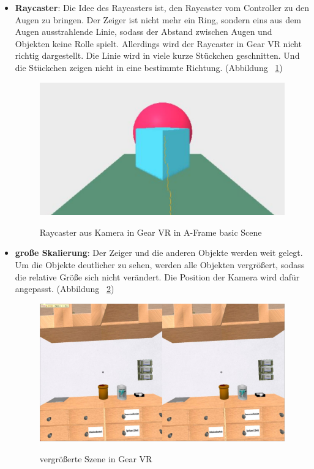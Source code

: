   \begin{itemize}
      \item \textbf{Raycaster}: Die Idee des Raycasters ist, den Raycaster vom Controller zu den Augen zu bringen. Der Zeiger ist nicht mehr ein Ring, sondern eins aus dem Augen ausstrahlende Linie, sodass der Abstand zwischen Augen und Objekten keine Rolle spielt. Allerdings wird der Raycaster in Gear VR nicht richtig dargestellt. Die Linie wird in viele kurze Stückchen geschnitten. Und die Stückchen zeigen nicht in eine bestimmte Richtung. (Abbildung ~\ref{fig:GearVRRaycaster})
      
\begin{figure}[ht]
\vspace*{2.5em}
\centering
\caption[Raycaster in Gear VR]{Raycaster aus Kamera in Gear VR in A-Frame basic Scene}
\includegraphics[width=\textwidth]{images/gearVRRaycaster.png}
\label{fig:GearVRRaycaster} 
\vspace*{1.5em}
\end{figure}
      
      \item \textbf{große Skalierung}: Der Zeiger und die anderen Objekte werden weit gelegt. Um die Objekte deutlicher zu sehen, werden alle Objekten vergrößert, sodass die relative Größe sich nicht verändert. Die Position der Kamera wird dafür angepasst.
      (Abbildung ~\ref{fig:GearVRCursor})
      
\begin{figure}[t]
\vspace*{1em}
\centering
\caption[vergrößerte Szene in Gear VR]{vergrößerte Szene in Gear VR}
\includegraphics[width=\textwidth]{images/gearVRCursor.png}
\label{fig:GearVRCursor} 
\end{figure}
      
  \end{itemize}
  
